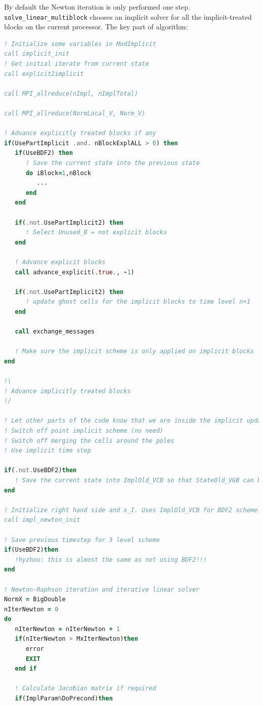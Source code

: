 \documentclass[11pt]{book} %
\begin{document}
By default the Newton iteration is only performed one step. \verb|solve_linear_multiblock| chooses an implicit solver for all the implicit-treated blocks on the current processor.
The key part of algorithm:
\begin{lstlisting}[language=Fortran, caption=Part implicit scheme]
! Initialize some variables in ModImplicit
call implicit_init
! Get initial iterate from current state
call explicit2implicit

call MPI_allreduce(nImpl, nImplTotal)

call MPI_allreduce(NormLocal_V, Norm_V)

! Advance explicitly treated blocks if any
if(UsePartImplicit .and. nBlockExplALL > 0) then
   if(UseBDF2) then
      ! Save the current state into the previous state
      do iBlock=1,nBlock
         ...
      end
   end
   
   if(.not.UsePartImplicit2) then
      ! Select Unused_B = not explicit blocks
   end
   
   ! Advance explicit blocks
   call advance_explicit(.true., -1)
   
   if(.not.UsePartImplicit2) then
      ! update ghost cells for the implicit blocks to time level n+1
   end
   
   call exchange_messages
   
   ! Make sure the implicit scheme is only applied on implicit blocks 
end

!\
! Advance implicitly treated blocks
!/

! Let other parts of the code know that we are inside the implicit update 
! Switch off point implicit scheme (no need)
! Switch off merging the cells around the poles
! Use implicit time step

if(.not.UseBDF2)then
   ! Save the current state into ImplOld_VCB so that StateOld_VGB can be restored
end

! Initialize right hand side and x_I. Uses ImplOld_VCB for BDF2 scheme.     
call impl_newton_init

! Save previous timestep for 3 level scheme
if(UseBDF2)then
   !hyzhou: this is almost the same as not using BDF2!!!
end

! Newton-Raphson iteration and iterative linear solver
NormX = BigDouble
nIterNewton = 0
do
   nIterNewton = nIterNewton + 1
   if(nIterNewton > MxIterNewton)then
      error
      EXIT
   end if

   ! Calculate Jacobian matrix if required
   if(ImplParam%DoPrecond)then


\end{lstlisting}
\end{document}
